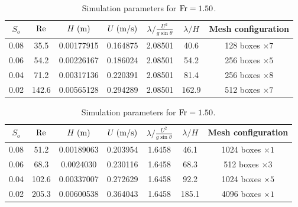 \documentclass[a4paper]{article}
\newcommand{\fr}{{\rm{Fr}}}
\newcommand{\sa}{\sin\theta}
\begin{document}
\begin{table}[htbp]
	\vspace{0.25cm}
	
	\begin{subtable}{1\textwidth}
		\centering
		\begin{tabular}{ccccccc}
			$S_o$ & $\rm Re$ & $H\;{\rm (m)}$ & $U\;{\rm (m/s)}$ & $\lambda/\frac{U^2}{g\sa}$ & $\lambda/H$ & Mesh configuration\\
			\toprule
			0.08 & 35.5 & 0.00177915 & 0.164875 & 2.08501 & 40.6 & 128 boxes $\times 7$\\
			
			0.06 & 54.2 & 0.00226167 & 0.186024 & 2.08501 & 54.2 & 256 boxes $\times 5$\\
			
			0.04 & 71.2 & 0.00317136 & 0.220391 & 2.08501 & 81.4 & 256 boxes $\times 8$\\
			
			0.02 & 142.6 & 0.00565128 & 0.294289 & 2.08501 & 162.9 & 512 boxes $\times 7$\\
			\bottomrule 
		\end{tabular}
		\caption{\textcolor{red}{TODO: Simulation parameters for $\fr=1.25$.}}
		\label{params_125}
	\end{subtable}
	
	\vspace{0.25cm}

	\begin{subtable}{1\textwidth}
		\centering
		\begin{tabular}{ccccccc}
			$S_o$ & $\rm Re$ & $H\;{\rm (m)}$ & $U\;{\rm (m/s)}$ & $\lambda/\frac{U^2}{g\sa}$ & $\lambda/H$ & Mesh configuration\\
			\toprule
			0.08 & 51.2 & 0.00189063 & 0.203954 & 1.6458 & 46.1 & 1024 boxes $\times 1$\\
			
			0.06 & 68.3 & 0.0024030 & 0.230116 & 1.6458 & 68.3 & 512 boxes $\times 3$\\
			
			0.04 & 102.6 & 0.00337007 & 0.272629 & 1.6458 & 92.2 & 1024 boxes $\times 5$\\
			
			0.02 & 205.3 & 0.00600538 & 0.364043 & 1.6458 & 185.1 & 4096 boxes $\times 1$\\
			\bottomrule 
		\end{tabular}
		\caption{Simulation parameters for $\fr=1.50$.}
		\label{params_150}
	\end{subtable}

	\vspace{0.25cm}
	

\end{table}
\end{document}
